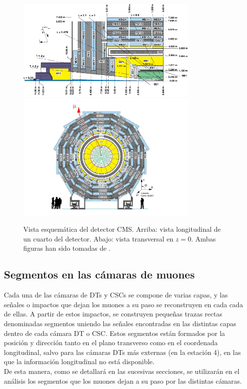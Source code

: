 \begin{figure}
\centering
\includegraphics[width=0.8\textwidth]{figures/CMSview1.png}
\includegraphics[width=0.8\textwidth]{figures/CMSview.png}
\caption{Vista esquem\'atica del detector CMS. Arriba: vista longitudinal de un cuarto del detector. Abajo: vista transversal en $z = 0$. Ambas figuras han sido tomadas de \cite{DTperformance}.}
\label{fig:CMSsub}
\end{figure}


\subsection{Segmentos en las c\'amaras de muones}

Cada una de las c\'amaras de DTs y CSCs se compone de varias capas, y las se\~nales o impactos que dejan los muones a su paso se reconstruyen en cada cada de ellas. A partir de estos impactos, se construyen peque\~nas trazas rectas denominadas segmentos uniendo las se\~nales encontradas en las distintas capas dentro de cada c\'amara DT o CSC. Estos segmentos est\'an formados por la posici\'on y direcci\'on tanto en el plano transverso como en el coordenada longitudinal, salvo para las c\'amaras DTs m\'as externas (en la estaci\'on 4), en las que la informaci\'on longitudinal no est\'a disponible. \\
De esta manera, como se detallar\'a en las sucesivas secciones, se utilizar\'an en el an\'alisis los segmentos que los muones dejan a su paso por las distintas c\'amaras.

\clearpage
